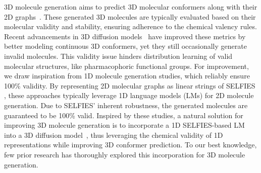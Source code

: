 3D molecule generation aims to predict 3D molecular conformers along with their 2D graphs~\citep{EDM}. These generated 3D molecules are typically evaluated based on their molecular validity and stability, ensuring adherence to the chemical valency rules. Recent advancements in 3D diffusion models~\citep{MiDi,MUDiff,JODO} have improved these metrics by better modeling continuous 3D conformers, yet they still occasionally generate invalid molecules.
This validity issue hinders distribution learning of valid  molecular structures, like pharmacophoric functional groups. For improvement, we draw inspiration from 1D molecule generation \citep{MolGen,moses} studies, which reliably ensure 100\% validity. By representing 2D molecular graphs as linear strings of SELFIES \citep{SELFIES}, these approaches typically leverage 1D language models (LMs) for 2D molecule generation. Due to SELFIES' inherent robustness, the generated molecules are guaranteed to be 100\% valid.
Inspired by these studies, a natural solution for improving 3D molecule generation is to incorporate a 1D SELFIES-based LM into a 3D diffusion model~\citep{torsion}, thus leveraging the chemical validity of 1D representations while improving 3D conformer prediction.
To our best knowledge, few prior research has thoroughly explored this incorporation for 3D molecule generation.



